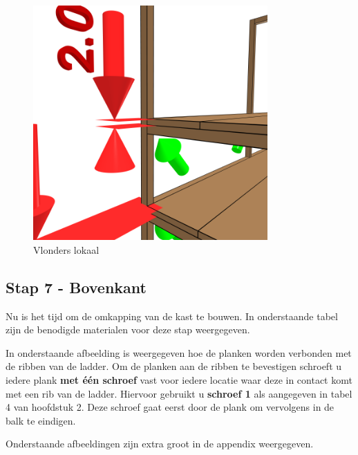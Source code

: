 \documentclass{article}
\begin{document}
\begin{figure}[h!]
    \centering
    \includegraphics[width=0.8\textwidth]{scene 6 - vlonders b.png}
    \caption{Vlonders lokaal}
    \label{fig:stap 6b}
\end{figure}

\clearpage
\newpage

\subsection{Stap 7 - Bovenkant}

Nu is het tijd om de omkapping van de kast te bouwen. In onderstaande tabel zijn de benodigde materialen voor deze stap weergegeven.



In onderstaande afbeelding is weergegeven hoe de planken worden verbonden met de ribben van de ladder. Om de planken aan de ribben te bevestigen schroeft u iedere plank \textbf{met \'{e}\'{en} schroef} vast voor iedere locatie waar deze in contact komt met een rib van de ladder. Hiervoor gebruikt u \textbf{schroef 1} als aangegeven in tabel 4 van hoofdstuk 2. Deze schroef gaat eerst door de plank om vervolgens in de balk te eindigen.

Onderstaande afbeeldingen zijn extra groot in de appendix weergegeven.
\end{document}
